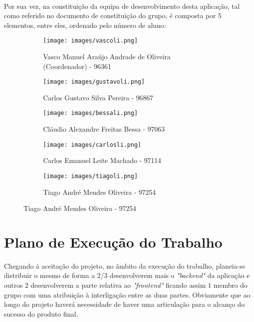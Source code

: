 \documentclass[a4paper,12pt]{scrreprt}
\begin{document}
        \paragraph{}
        Por sua vez, na constituição da equipa de desenvolvimento desta aplicação, tal como referido no documento de constituição do grupo, é composta por 5 elementos, entre eles, ordenado pelo número de aluno:

    \begin{figure}[!ht]
            \begin{subfigure}{0.5\textwidth}
            \texttt{[image: images/vascoli.png]}
            \caption{Vasco Manuel Araújo Andrade de Oliveira (Coordenador) - 96361}
            \end{subfigure}
            \begin{subfigure}{0.5\textwidth}
            \texttt{[image: images/gustavoli.png]} 
            \caption{Carlos Gustavo Silva Pereira - 96867}
            \end{subfigure}
            \begin{subfigure}{0.5\textwidth}
            \texttt{[image: images/bessali.png]} 
            \caption{Cláudio Alexandre Freitas Bessa - 97063}
            \end{subfigure}
            \begin{subfigure}{0.5\textwidth}
            \texttt{[image: images/carlosli.png]} 
            \caption{Carlos Emanuel Leite Machado - 97114}
            \end{subfigure}
            \begin{subfigure}{0.5\textwidth}
            \texttt{[image: images/tiagoli.png]} 
            \caption{Tiago André Mendes Oliveira - 97254}
            \end{subfigure}
        \end{figure}
    
        \pagebreak
    
    \section{Plano de Execução do Trabalho}
        \paragraph{}
        Chegando à aceitação do projeto, no âmbito da execução do trabalho, planeia-se distribuir o mesmo de forma a $2$/$3$ desenvolverem mais o \textit{"backend"} da aplicação e outros $2$ desenvolverem a parte relativa ao \textit{"frontend"} ficando assim $1$ membro do grupo com uma atribuição à interligação entre as duas partes. Obviamente que ao longo do projeto haverá necessidade de haver uma articulação para o alcanço do sucesso do produto final.
\end{document}
